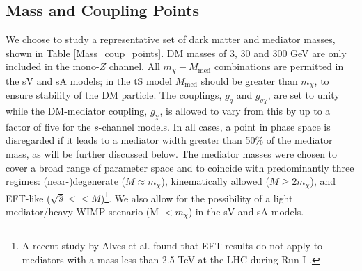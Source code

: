 \subsection{Mass and Coupling Points}  %
We choose to study a representative set of dark matter and mediator masses, shown in Table \ref{Mass_coup_points}. DM masses of 3, 30 and 300 GeV are only included in the mono-$Z$ channel. All $m_{\chi}-M_{\mathrm{med}}$ combinations are permitted in the sV and sA models; in the tS model $M_{\mathrm{med}}$ should be greater than $m_{\chi}$, to ensure stability of the DM particle. The couplings, $g_{q}$ and $g_{q\chi}$, are set to unity while the DM-mediator coupling, $g_{\chi}$, is allowed to vary from this by up to a factor of five for the $s$-channel models. In all cases, a point in phase space is disregarded if it leads to a mediator width greater than 50\% of the mediator mass, as will be further discussed below. The mediator masses were chosen to cover a broad range of parameter space and to coincide with predominantly three regimes: (near-)degenerate ($M\approx m_{\chi}$), kinematically allowed ($M \geq 2m_{\chi}$), and EFT-like ($\sqrt{\hat{s}} << M$)\footnote{A recent study by Alves et al. found that EFT results do not apply to mediators with a mass less than 2.5 TeV at the LHC during Run I \cite{Alves:2011wf}.}. We also allow for the possibility of a light mediator/heavy WIMP scenario (M $<m_{\chi}$) in the sV and sA models.

